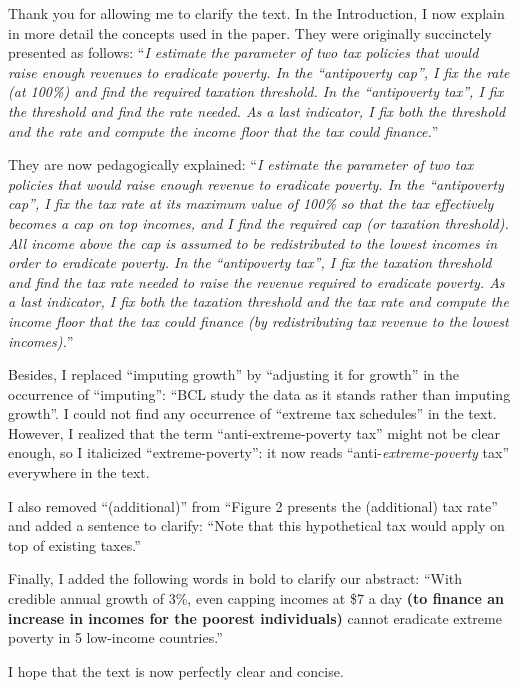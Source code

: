 \documentclass[12pt,english]{article}
\begin{document}
Thank you for allowing me to clarify the text. In the Introduction, I now explain in more detail the concepts used in the paper. They were originally succinctely presented as follows: ``\textit{I estimate the parameter of two tax policies that would raise enough revenues to eradicate poverty. In the ``antipoverty cap'', I fix the rate (at 100\%) and find the required taxation threshold. In the ``antipoverty tax'', I fix the threshold and find the rate needed. As a last indicator, I fix both the threshold and the rate and compute the income floor that the tax could finance.}'' 

They are now pedagogically explained: ``\textit{I estimate the parameter of two tax policies that would raise enough revenue to eradicate poverty. In the ``antipoverty cap'', I fix the tax rate at its maximum value of 100\% so that the tax effectively becomes a cap on top incomes, and I find the required cap (or taxation threshold). All income above the cap is assumed to be redistributed to the lowest incomes in order to eradicate poverty. In the ``antipoverty tax'', I fix the taxation threshold and find the tax rate needed to raise the revenue required to eradicate poverty. As a last indicator, I fix both the taxation threshold and the tax rate and compute the income floor that the tax could finance (by redistributing tax revenue to the lowest incomes).}''

Besides, I replaced ``imputing growth'' by ``adjusting it for growth'' in the occurrence of ``imputing'': ``BCL study the data as it stands rather than imputing growth''. I could not find any occurrence of ``extreme tax schedules'' in the text. However, I realized that the term ``anti-extreme-poverty tax'' might not be clear enough, so I italicized ``extreme-poverty'': it now reads ``anti-\textit{extreme-poverty} tax'' everywhere in the text.

I also removed ``(additional)'' from ``Figure 2 presents the (additional) tax rate'' and added a sentence to clarify: ``Note that this hypothetical tax would apply on top of existing taxes.'' 

Finally, I added the following words in bold to clarify our abstract: ``With credible annual growth of 3\%, even capping incomes at \$7 a day \textbf{(to finance an increase in incomes for the poorest individuals)} cannot eradicate extreme poverty in 5 low-income countries.''

I hope that the text is now perfectly clear and concise.

~\\ ~\\
\end{document}
